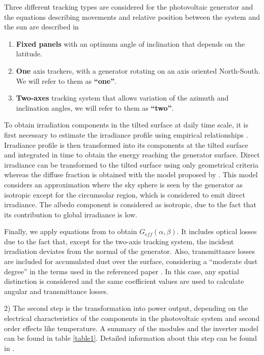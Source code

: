 Three different tracking types are considered for the photovoltaic generator and the equations describing movements and relative position between the system and the sun are described in \cite{Perpinan2009}
\begin{enumerate}
\item \textbf{Fixed panels} with an optimum angle of inclination that depends on the latitude.
\item \textbf{One} axis trackers, with a generator rotating on an axis oriented North-South. We will refer to them as \textbf{“one”}.
\item \textbf{Two-axes} tracking system that allows variation of the azimuth and inclination angles, we will refer to them as \textbf{“two”}.
\end{enumerate}

To obtain irradiation components in the tilted surface at daily time scale, it is first necessary to estimate the irradiance profile using empirical relationships \citep{Collares-Pereira1979}. Irradiance profile is then transformed into its components at the tilted surface and integrated in time to obtain the energy reaching the generator surface. Direct irradiance can be transformed to the tilted surface using only geometrical criteria whereas the diffuse fraction is obtained with the model proposed by \cite{hay1985estimating}. This model considers an approximation where the sky sphere is seen by the generator as isotropic except for the circumsolar region, which is considered to emit direct irradiance. The albedo component is considered as isotropic, due to the fact that its contribution to global irradiance is low. 

Finally, we apply equations from \cite{Martin2001} to obtain $G_{eff}(\alpha, \beta)$. It includes optical losses due to the fact that, except for the two-axis tracking system, the incident irradiation deviates from the normal of the generator. Also, transmittance losses are included for accumulated dust over the surface, considering a ``moderate dust degree'' in the terms used in the referenced paper \cite{Martin2001}. In this case, any spatial distinction is considered and the same coefficient values are used to calculate angular and transmittance losses. 

2) The second step is the transformation into power output, depending on the electrical characteristics of the components in the photovoltaic system and second order effects like temperature. A summary of the modules and the inverter model can be found in table \ref{table1}. Detailed information about this step can be found in \cite{Perpinan2009}.


